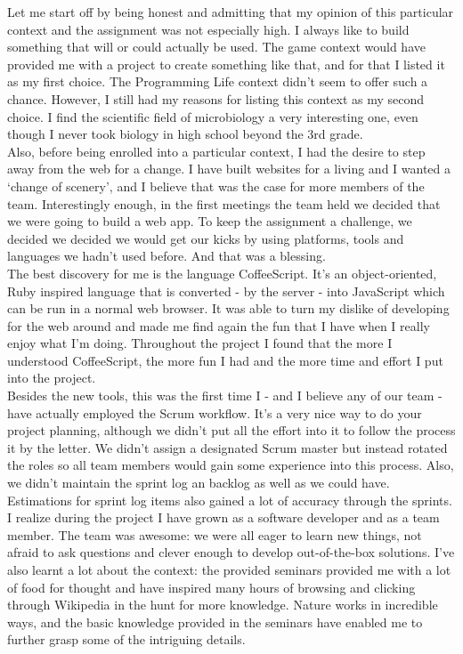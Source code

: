 Let me start off by being honest and admitting that my opinion of this particular context and the assignment was not especially high. I always like to build something that will or could actually be used. The game context would have provided me with a project to create something like that, and for that I listed it as my first choice. The Programming Life context didn’t seem to offer such a chance. However, I still had my reasons for listing this context as my second choice. I find the scientific field of microbiology a very interesting one, even though I never took biology in high school beyond the 3rd grade. \\

Also, before being enrolled into a particular context, I had the desire to step away from the web for a change. I have built websites for a living and I wanted a ‘change of scenery’, and I believe that was the case for more members of the team. Interestingly enough, in the first meetings the team held we decided that we were going to build a web app. To keep the assignment a challenge, we decided we decided we would get our kicks by using platforms, tools and languages we hadn’t used before. And that was a blessing. \\

The best discovery for me is the language CoffeeScript. It’s an object-oriented, Ruby inspired language that is converted - by the server - into JavaScript which can be run in a normal web browser. It was able to turn my dislike of developing for the web around and made me find again the fun that I have when I really enjoy what I’m doing. Throughout the project I found that the more I understood CoffeeScript, the more fun I had and the more time and effort I put into the project. \\

Besides the new tools, this was the first time I - and I believe any of our team - have actually employed the Scrum workflow. It’s a very nice way to do your project planning, although we didn’t put all the effort into it to follow the process it by the letter. We didn’t assign a designated Scrum master but instead rotated the roles so all team members would gain some experience into this process. Also, we didn’t maintain the sprint log an backlog as well as we could have. Estimations for sprint log items also gained a lot of accuracy through the sprints. \\

I realize during the project I have grown as a software developer and as a team member. The team was awesome: we were all eager to learn new things, not afraid to ask questions and clever enough to develop out-of-the-box solutions. I’ve also learnt a lot about the context: the provided seminars provided me with a lot of food for thought and have inspired many hours of browsing and clicking through Wikipedia in the hunt for more knowledge. Nature works in incredible ways, and the basic knowledge provided in the seminars have enabled me to further grasp some of the intriguing details.
